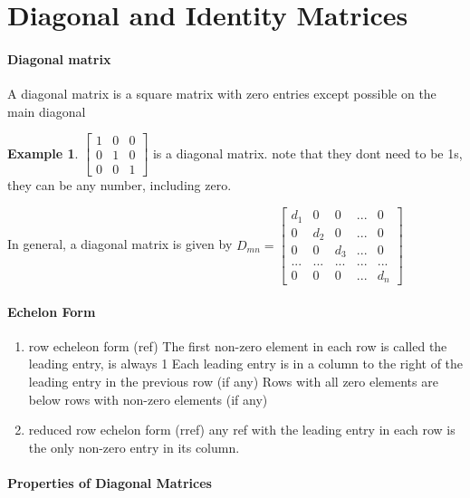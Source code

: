 \documentclass{article}
\theoremstyle{definition}
\newtheorem{example}[theorem]{Example}
\theoremstyle{remark}
\begin{document}
\section{Diagonal and Identity Matrices}

\paragraph{Diagonal matrix}
A diagonal matrix is a square matrix with zero entries except possible on the main diagonal

\begin{example}
    $\begin{bmatrix}
        1 & 0 & 0 \\
        0 & 1 & 0 \\
        0 & 0 & 1
    \end{bmatrix}$ is a diagonal matrix. note that they dont need to be 1s, they can be any number, including zero. 
\end{example}

In general, a diagonal matrix is given by $D_{mn} = \begin{bmatrix}
    d_1 & 0 & 0 & ... & 0 \\
    0 & d_2 & 0 & ... & 0 \\
    0 & 0 & d_3 & ... & 0 \\
    ... & ... & ... & ... & ... \\
    0 & 0 & 0 & ... & d_n
\end{bmatrix}$

\paragraph{Echelon Form}

\begin{enumerate}
    \item row echeleon form (ref)
    \subitem The first non-zero element in each row is called the leading entry, is always 1
    \subitem Each leading entry is in a column to the right of the leading entry in the previous row (if any)
    \subitem Rows with all zero elements are below rows with non-zero elements (if any)
    \item reduced row echelon form (rref)
    \subitem any ref with the leading entry in each row is the only non-zero entry in its column. 
\end{enumerate}

\paragraph{Properties of Diagonal Matrices}
\end{document}
